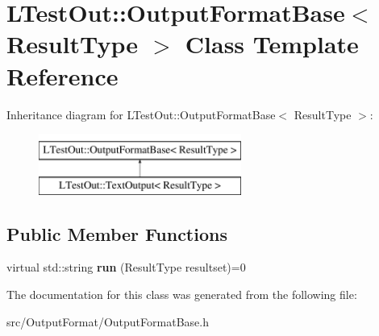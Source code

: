 \hypertarget{class_l_test_out_1_1_output_format_base}{\section{L\-Test\-Out\-:\-:Output\-Format\-Base$<$ Result\-Type $>$ Class Template Reference}
\label{class_l_test_out_1_1_output_format_base}
}
Inheritance diagram for L\-Test\-Out\-:\-:Output\-Format\-Base$<$ Result\-Type $>$\-:\begin{figure}[H]
\begin{center}
\leavevmode
\includegraphics[height=2.000000cm]{class_l_test_out_1_1_output_format_base}
\end{center}
\end{figure}
\subsection*{Public Member Functions}
\begin{DoxyCompactItemize}
\item 
\hypertarget{class_l_test_out_1_1_output_format_base_a7ef61b5f9459d70552e3764dcc6963cb}{virtual std\-::string {\bfseries run} (Result\-Type resultset)=0}\label{class_l_test_out_1_1_output_format_base_a7ef61b5f9459d70552e3764dcc6963cb}

\end{DoxyCompactItemize}


The documentation for this class was generated from the following file\-:\begin{DoxyCompactItemize}
\item 
src/\-Output\-Format/Output\-Format\-Base.\-h\end{DoxyCompactItemize}
